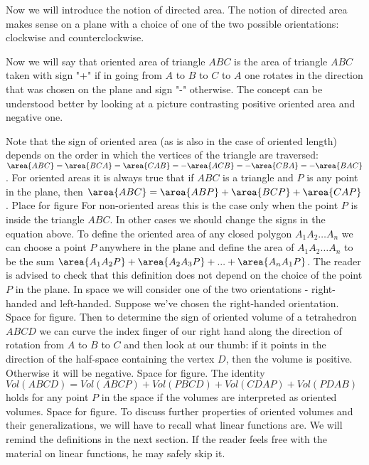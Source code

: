 Now we will introduce the notion of directed area.
The notion of directed area makes sense on a plane with a choice of one of the two possible orientations: clockwise and counterclockwise.

Now we will say that oriented area of triangle $ABC$ is the area of triangle $ABC$ taken with sign "+" if in going from $A$ to $B$ to $C$ to $A$ one rotates in the direction that was chosen on the plane and sign "-" otherwise. The concept can be understood better by looking at a picture contrasting positive oriented area and negative one.

Note that the sign of oriented area (as is also in the case of oriented length) depends on the order in which the vertices of the triangle are traversed: $\area{ABC}=\area{BCA}=\area{CAB}=-\area{ACB}=-\area{CBA}=-\area{BAC}$. For oriented areas it is always true that if $ABC$ is a triangle and $P$ is any point in the plane, then $\area{ABC}=\area{ABP}+\area{BCP}+\area{CAP}$.
Place for figure
For non-oriented areas this is the case only when the point $P$ is inside the triangle $ABC$. In other cases we should change the signs in the equation above.
To define the oriented area of any closed polygon $A_1A_2\ldots A_n$ we can choose a point $P$ anywhere in the plane and define the area of $A_1A_2\ldots A_n$ to be the sum $\area{A_1A_2P}+\area{A_2A_3P}+...+\area{A_nA_1P}$. The reader is advised to check that this definition does not depend on the choice of the point $P$ in the plane.
In space we will consider one of the two orientations - right-handed and left-handed. Suppose we've chosen the right-handed orientation.
Space for figure.
Then to determine the sign of oriented volume of a tetrahedron $ABCD$ we can curve the index finger of our right hand along the direction of rotation from $A$ to $B$ to $C$ and then look at our thumb: if it points in the direction of the half-space containing the vertex $D$, then the volume is positive. Otherwise it will be negative.
Space for figure.
The identity $Vol(ABCD)=Vol(ABCP)+Vol(PBCD)+Vol(CDAP)+Vol(PDAB)$ holds for any point $P$ in the space if the volumes are interpreted as oriented volumes.
Space for figure.
To discuss further properties of oriented volumes and their generalizations, we will have to recall what linear functions are. We will remind the definitions in the next section. If the reader feels free with the material on linear functions, he may safely skip it.
